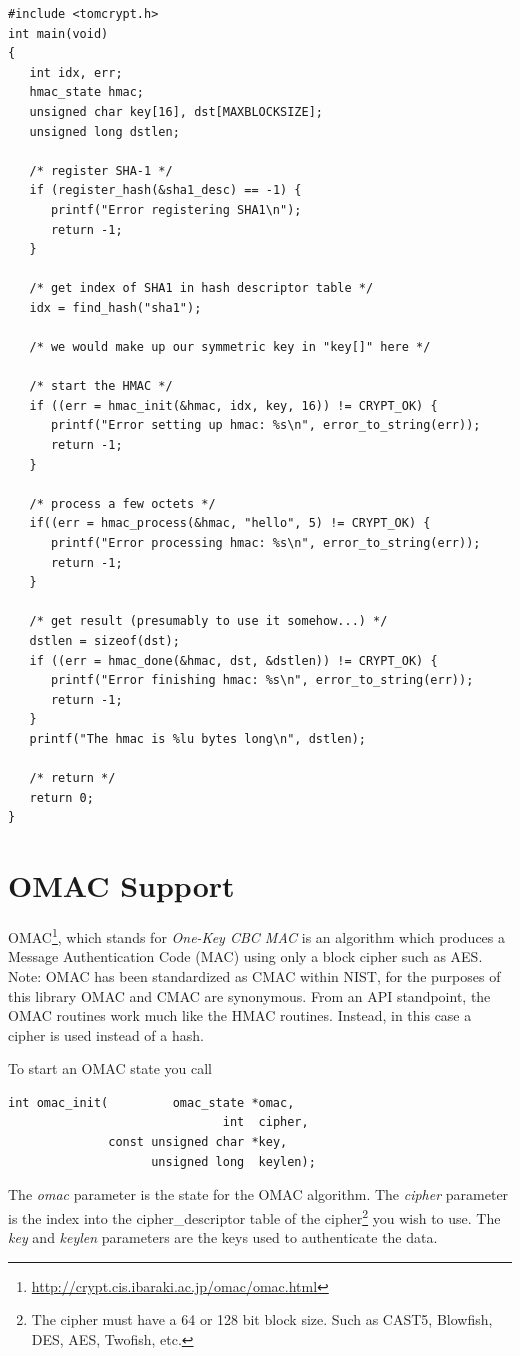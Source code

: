 \documentclass[synpaper]{book}
\newcommand{\mysection}[1]    %
	{                   %
	\section{#1}
   \markboth{\textsf{www.libtom.net}}{\thesection ~ {#1}}
	}
\begin{document}
\begin{small}
\begin{verbatim}
#include <tomcrypt.h>
int main(void)
{
   int idx, err;
   hmac_state hmac;
   unsigned char key[16], dst[MAXBLOCKSIZE];
   unsigned long dstlen;

   /* register SHA-1 */
   if (register_hash(&sha1_desc) == -1) {
      printf("Error registering SHA1\n");
      return -1;
   }

   /* get index of SHA1 in hash descriptor table */
   idx = find_hash("sha1");

   /* we would make up our symmetric key in "key[]" here */

   /* start the HMAC */
   if ((err = hmac_init(&hmac, idx, key, 16)) != CRYPT_OK) {
      printf("Error setting up hmac: %s\n", error_to_string(err));
      return -1;
   }

   /* process a few octets */
   if((err = hmac_process(&hmac, "hello", 5) != CRYPT_OK) {
      printf("Error processing hmac: %s\n", error_to_string(err));
      return -1;
   }

   /* get result (presumably to use it somehow...) */
   dstlen = sizeof(dst);
   if ((err = hmac_done(&hmac, dst, &dstlen)) != CRYPT_OK) {
      printf("Error finishing hmac: %s\n", error_to_string(err));
      return -1;
   }
   printf("The hmac is %lu bytes long\n", dstlen);

   /* return */
   return 0;
}
\end{verbatim}
\end{small}

\mysection{OMAC Support}
 
OMAC\footnote{\url{http://crypt.cis.ibaraki.ac.jp/omac/omac.html}}, which stands for \textit{One-Key CBC MAC} is an
algorithm which produces a Message Authentication Code (MAC) using only a block cipher such as AES.  Note:  OMAC has been standardized as
CMAC within NIST, for the purposes of this library OMAC and CMAC are synonymous.  From an API standpoint, the OMAC routines work much like the
HMAC routines.  Instead, in this case a cipher is used instead of a hash.

To start an OMAC state you call
\begin{verbatim}
int omac_init(         omac_state *omac,
                              int  cipher,
              const unsigned char *key,
                    unsigned long  keylen);
\end{verbatim}
The \textit{omac} parameter is the state for the OMAC algorithm.  The \textit{cipher} parameter is the index into the cipher\_descriptor table
of the cipher\footnote{The cipher must have a 64 or 128 bit block size.  Such as CAST5, Blowfish, DES, AES, Twofish, etc.} you
wish to use.  The \textit{key} and \textit{keylen} parameters are the keys used to authenticate the data.
\end{document}
